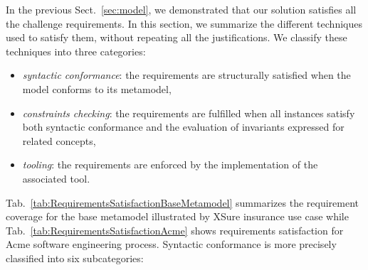
In the previous Sect.~\ref{sec:model}, we demonstrated that our solution
satisfies all the challenge requirements. In this section, we summarize the
different techniques used to satisfy them, without repeating all the
justifications. We classify these techniques into three categories:
\begin{itemize}
    \item \emph{syntactic conformance}: the requirements are structurally
      satisfied when the model conforms to its metamodel,
    \item \emph{constraints checking}: the requirements are fulfilled when all
      instances satisfy both syntactic conformance and the evaluation of
      invariants expressed for related concepts,
    \item \emph{tooling}: the requirements are enforced by the implementation
      of the associated tool.
\end{itemize}


Tab.~\ref{tab:RequirementsSatisfactionBaseMetamodel} summarizes the requirement
coverage for the base metamodel illustrated by XSure insurance use case while
Tab.~\ref{tab:RequirementsSatisfactionAcme} shows requirements satisfaction for
Acme software engineering process. Syntactic conformance is more precisely
classified into six subcategories:

